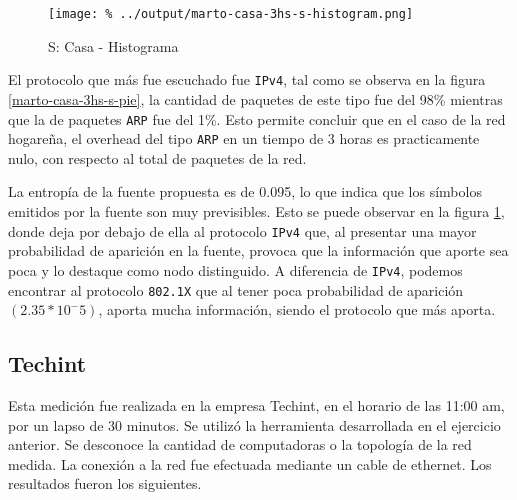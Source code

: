 \documentclass[final,inline,a4paper,narroweqnarray]{ieee}
\begin{document}
    \begin{figure}[ht]\begin{center}
     \texttt{[image: \%
      ../output/marto-casa-3hs-s-histogram.png]}
      \caption{S: Casa - Histograma}
      \label{marto-casa-3hs-s-histogram}
    \end{center}\end{figure}

    El protocolo que más fue escuchado fue \texttt{IPv4}, tal como se
    observa en la figura \ref{marto-casa-3hs-s-pie}, la cantidad de
    paquetes  de este tipo fue del 98\% mientras que la de paquetes
    \texttt{ARP} fue del 1\%. Esto permite concluir que en el caso de
    la red hogareña, el overhead del tipo \texttt{ARP} en un tiempo de
    3 horas es practicamente nulo, con respecto al total de paquetes
    de la red.

    La entropía de la fuente propuesta es de 0.095, lo que indica que
    los símbolos emitidos por la fuente son muy previsibles. Esto se
    puede observar en la figura \ref{marto-casa-3hs-s-histogram},
    donde deja por debajo de ella al protocolo \texttt{IPv4} que, al
    presentar una mayor probabilidad de aparición en la fuente,
    provoca que la información que aporte sea poca y lo destaque como
    nodo distinguido. A diferencia de
    \texttt{IPv4}, podemos encontrar al protocolo \texttt{802.1X} que al
    tener poca probabilidad de aparición $(2.35 * 10^-5)$, aporta mucha
    información, siendo el protocolo que más aporta.
      
    
    \subsection{Techint}

    Esta medición fue realizada en la empresa Techint, en el horario
    de las 11:00 am, por un lapso de 30 minutos. Se utilizó la
    herramienta desarrollada en el ejercicio anterior. Se desconoce la
    cantidad de computadoras o la topología de la red medida. La
    conexión a la red fue efectuada mediante un cable de ethernet. Los
    resultados fueron los siguientes.
\end{document}
